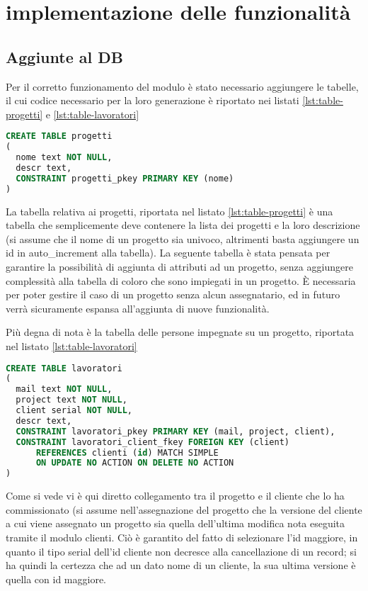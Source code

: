 \section{implementazione delle funzionalità}
\subsection{Aggiunte al DB}
Per il corretto funzionamento del modulo è stato necessario aggiungere le tabelle, il cui codice necessario per la loro generazione è riportato nei listati \ref{lst:table-progetti} e \ref{lst:table-lavoratori}
\begin{lstlisting}[language=SQL,caption=codice per la tabella progetti, label=lst:table-progetti]
CREATE TABLE progetti
(
  nome text NOT NULL,
  descr text,
  CONSTRAINT progetti_pkey PRIMARY KEY (nome)
)
\end{lstlisting}
La tabella relativa ai progetti, riportata nel listato \ref{lst:table-progetti} è una tabella che semplicemente deve contenere la lista dei progetti e la loro descrizione (si assume  che il nome di un progetto sia univoco, altrimenti basta aggiungere un id in auto\_increment alla tabella). La seguente tabella è stata pensata per garantire la possibilità di aggiunta di attributi ad un progetto,  senza aggiungere complessità alla tabella di coloro che sono impiegati in un progetto.
È necessaria per poter gestire il caso di un progetto senza alcun assegnatario, ed in futuro verrà sicuramente espansa all'aggiunta di nuove funzionalità.

Più degna di nota è la tabella delle persone impegnate su un progetto, riportata nel listato \ref{lst:table-lavoratori}

\begin{lstlisting}[language=SQL,caption=codice per la tabella lavoratori, label=lst:table-lavoratori]
CREATE TABLE lavoratori
(
  mail text NOT NULL,
  project text NOT NULL,
  client serial NOT NULL,
  descr text,
  CONSTRAINT lavoratori_pkey PRIMARY KEY (mail, project, client),
  CONSTRAINT lavoratori_client_fkey FOREIGN KEY (client)
      REFERENCES clienti (id) MATCH SIMPLE
      ON UPDATE NO ACTION ON DELETE NO ACTION
)
\end{lstlisting}

Come si vede vi è qui diretto collegamento tra il progetto e il cliente che lo ha commissionato (si assume nell’assegnazione del progetto che la versione del cliente a cui viene assegnato un progetto sia quella dell’ultima modifica nota eseguita tramite il modulo clienti. Ciò è garantito del fatto di selezionare l’id maggiore, in quanto il tipo serial dell’id cliente non decresce alla cancellazione di un record; si ha quindi la certezza che ad un dato nome di un cliente, la sua ultima versione è quella con id maggiore.

